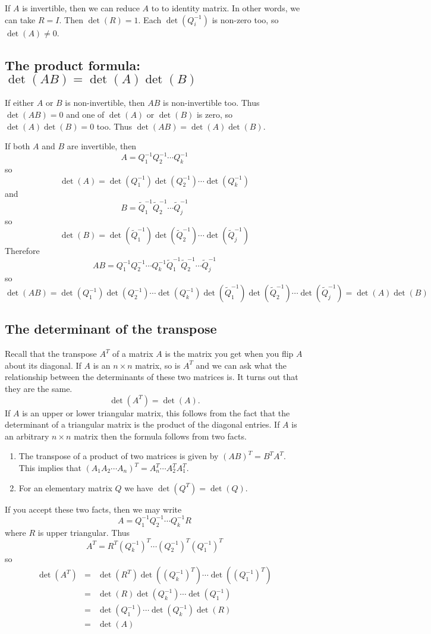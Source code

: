 If $A$ is invertible, then we can reduce $A$ to to identity matrix. In
other words, we can take $R=I$. Then $\det(R)=1$. Each
$\det(Q_i^{-1})$ is non-zero too, so $\det(A)\ne 0$.

\subsection{The product formula: $\det(AB)=\det(A)\det(B)$}
\label{sec:dettheory6}

If either $A$ or $B$ is non-invertible, then $AB$ is non-invertible
too. Thus $\det(AB)=0$ and one of $\det(A)$ or $\det(B)$ is zero, so
$\det(A)\det(B)=0$ too. Thus $\det(AB)=\det(A)\det(B)$.

If both $A$ and $B$ are invertible, then
\[
A= Q_1^{-1}Q_2^{-1}\cdots Q_k^{-1}
\]
so
\[
\det(A) = \det(Q_1^{-1})\det(Q_2^{-1})\cdots \det(Q_k^{-1})
\]
and 
\[
B= \tilde Q_1^{-1}\tilde Q_2^{-1}\cdots \tilde Q_j^{-1}
\]
so
\[
\det(B) = \det(\tilde Q_1^{-1})\det(\tilde Q_2^{-1})\cdots \det(\tilde
Q_j^{-1})
\]
Therefore
\[
AB=Q_1^{-1}Q_2^{-1}\cdots Q_k^{-1}\tilde Q_1^{-1}\tilde Q_2^{-1}\cdots
\tilde Q_j^{-1}
\]
so
\[
\det(AB)=\det(Q_1^{-1})\det(Q_2^{-1})\cdots \det(Q_k^{-1}) \det(\tilde
Q_1^{-1})\det(\tilde Q_2^{-1})\cdots \det(\tilde
Q_j^{-1})=\det(A)\det(B)
\]

\subsection{The determinant of the transpose}
\label{sec:dettheory7}

Recall that the transpose $A^T$ of a matrix $A$ is the matrix you get
when you flip $A$ about its diagonal. If $A$ is an $n\times n$ matrix,
so is $A^T$ and we can ask what the relationship between the
determinants of these two matrices is. It turns out that they are the
same.
\[
\det(A^T)=\det(A).
\] 
If $A$ is an upper or lower triangular matrix, this follows from the
fact that the determinant of a triangular matrix is the product of the
diagonal entries. If $A$ is an arbitrary $n\times n$ matrix then the
formula follows from two facts.

\begin{enumerate}[(1)]
\item The transpose of a product of two matrices is given by
$(AB)^T=B^TA^T$. This implies that $(A_1A_2\cdots A_n)^T=A_n^T\cdots
A_2^TA_1^T$.
\item For an elementary matrix $Q$ we have $\det(Q^T)=\det(Q)$.
\end{enumerate}
If you accept these two facts, then we may write
\[
A= Q_1^{-1}Q_2^{-1}\cdots Q_k^{-1}R
\]
where $R$ is upper triangular. Thus
\[
A^T=R^T(Q_k^{-1})^T\cdots (Q_2^{-1})^T(Q_1^{-1})^T
\]
so
\begin{eqnarray*}
\det(A^T)&=&\det(R^T)\det((Q_k^{-1})^T)\cdots \det((Q_1^{-1})^T) \\
&=&\det(R)\det(Q_k^{-1})\cdots \det(Q_1^{-1}) \\
&=&\det(Q_1^{-1})\cdots \det(Q_k^{-1})\det(R) \\
&=&\det(A)
\end{eqnarray*}


